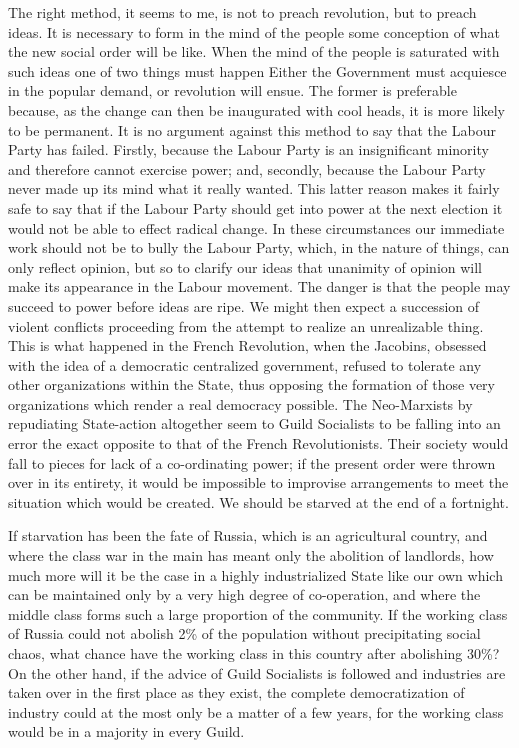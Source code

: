 \documentclass{book}
\begin{document}
The right method, it seems to me, is not to preach revolution, but to preach ideas. It is necessary to form in the mind of the people some conception of what the new social order will be like. When the mind of the people is saturated with such ideas one of two things must happen Either the Government must acquiesce in the popular demand, or revolution will ensue. The former is preferable because, as the change can then be inaugurated with cool heads, it is more likely to be permanent. It is no argument against this method to say that the Labour Party has failed. Firstly, because the Labour Party is an insignificant minority and therefore cannot exercise power; and, secondly, because the Labour Party never made up its mind what it really wanted. This latter reason makes it fairly safe to say that if the Labour Party should get into power at the next election it would not be able to effect radical change. In these circumstances our immediate work should not be to bully the Labour Party, which, in the nature of things, can only reflect opinion, but so to clarify our ideas that unanimity of opinion will make its appearance in the Labour movement. The danger is that the people may succeed to power before ideas are ripe. We might then expect a succession of violent conflicts proceeding from the attempt to realize an unrealizable thing. This is what happened in the French Revolution, when the Jacobins, obsessed with the idea of a democratic centralized government, refused to tolerate any other organizations within the State, thus opposing the formation of those very organizations which render a real democracy possible. The Neo-Marxists by repudiating State-action altogether seem to Guild Socialists to be falling into an error the exact opposite to that of the French Revolutionists. Their society would fall to pieces for lack of a co-ordinating power; if the present order were thrown over in its entirety, it would be impossible to improvise arrangements to meet the situation which would be created. We should be starved at the end of a fortnight.

If starvation has been the fate of Russia, which is an agricultural country, and where the class war in the main has meant only the abolition of landlords, how much more will it be the case in a highly industrialized State like our own which can be maintained only by a very high degree of co-operation, and where the middle class forms such a large proportion of the community. If the working class of Russia could not abolish 2\% of the population without precipitating social chaos, what chance have the working class in this country after abolishing 30\%? On the other hand, if the advice of Guild Socialists is followed and industries are taken over in the first place as they exist, the complete democratization of industry could at the most only be a matter of a few years, for the working class would be in a majority in every Guild.
\end{document}
